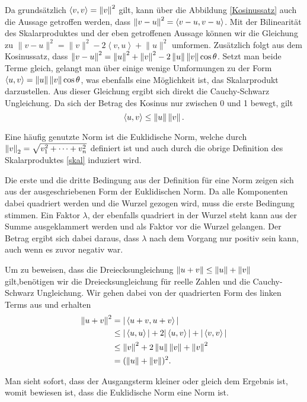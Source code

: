 Da grundsätzlich $\langle v,v\rangle  = \left\lVert v\right\rVert^2$ gilt, kann über die Abbildung \ref{Kosinussatz} auch die Aussage getroffen werden, dass $\left\lVert v-u\right\rVert^2 = \left\langle v-u,v-u\right\rangle $. Mit der Bilinearität des Skalarproduktes und der eben getroffenen Aussage können wir die Gleichung zu 
$\lVert v-u\rVert ^2 = \lVert v\rVert ^2 - 2\left\langle v,u\right\rangle  + \lVert u\rVert ^2$
umformen.
Zusätzlich folgt aus dem Kosinussatz, dass $\left\lVert v-u\right\rVert^2 = \left\lVert u\right\rVert^2 + \left\lVert v\right\rVert^2 - 2 \left\lVert u\right\rVert \left\lVert v\right\rVert \cos\theta$. Setzt man beide Terme gleich, gelangt man über einige wenige Umformungen zu der Form $\left\langle u,v\right\rangle  = \left\lVert u\right\rVert \left\lVert v\right\rVert \cos\theta$, was ebenfalls eine Möglichkeit ist, das Skalarprodukt darzustellen.
Aus dieser Gleichung ergibt sich direkt die Cauchy-Schwarz Ungleichung. Da sich der Betrag des Kosinus nur zwischen 0 und 1 bewegt, gilt
\begin{equation}
\left\langle u,v\right\rangle  \leq \norm{u} \norm{v}.
\label{cauchy}
\end{equation}

Eine häufig genutzte Norm ist die Euklidische Norm, welche durch $\left\lVert v\right\rVert_2 = \sqrt{v_1^2 + \dots + v_n^2}$ definiert ist und auch durch die obrige Definition des Skalarproduktes \eqref{skal} induziert wird.

Die erste und die dritte Bedingung aus der Definition für eine Norm zeigen sich aus der ausgeschriebenen Form der Euklidischen Norm. Da alle Komponenten dabei quadriert werden und die Wurzel gezogen wird, muss die erste Bedingung stimmen. Ein Faktor $\lambda$, der ebenfalls quadriert in der Wurzel steht kann aus der Summe ausgeklammert werden und als Faktor vor die Wurzel gelangen. Der Betrag ergibt sich dabei daraus, dass $\lambda$ nach dem Vorgang nur positiv sein kann, auch wenn es zuvor negativ war.

Um zu beweisen, dass die Dreiecksungleichung $\left\lVert u+v\right\rVert \leq\left\lVert u\right\rVert + \left\lVert v\right\rVert$  gilt,benötigen wir die Dreiecksungleichung für reelle Zahlen und die Cauchy-Schwarz Ungleichung. Wir gehen dabei von der quadrierten Form des linken Terms aus und erhalten
\begin{align*}
\left\lVert u+v\right\rVert^2 &= |\left\langle u+v,u+v\right\rangle|\\
&\leq |\left\langle u,u\right\rangle| + 2|\left\langle u,v\right\rangle| + |\left\langle v,v\right\rangle|\\
&\leq \left\lVert v\right\rVert^2 + 2\left\lVert u\right\rVert \left\lVert v\right\rVert + \left\lVert v\right\rVert^2\\
&= (\left\lVert u\right\rVert + \left\lVert v\right\rVert)^2.
\end{align*}

Man sieht sofort, dass der Ausgangsterm kleiner oder gleich dem Ergebnis ist, womit bewiesen ist, dass die Euklidische Norm eine Norm ist.

%
